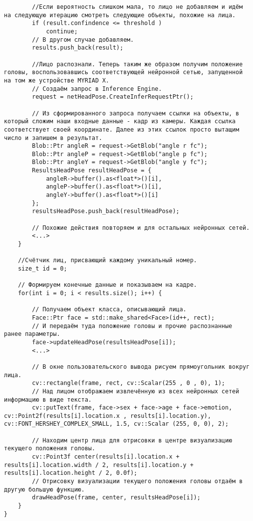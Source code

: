 \documentclass[12pt,a4paper]{scrartcl}
\begin{document}
\begin{verbatim}
		//Если вероятность слишком мала, то лицо не добавляем и идём на следующую итерацию смотреть следующие объекты, похожие на лица.
		if (result.confindence <= threshold ) 
			continue;
		// В другом случае добавляем.
		results.push_back(result);
		
		//Лицо распознали. Теперь таким же образом получим положение головы, воспользовавшись соответствующей нейронной сетью, запущенной на том же устройстве MYRIAD X.
		// Создаём запрос в Inference Engine.
		request = netHeadPose.CreateInferRequestPtr();
		
		// Из сформированного запроса получаем ссылки на объекты, в который сложим наши входные данные - кадр из камеры. Каждая ссылка соответствует своей координате. Далее из этих ссылок просто вытащим число и запишем в результат.
		Blob::Ptr angleR = request->GetBlob("angle r fc");
		Blob::Ptr angleP = request->GetBlob("angle p fc");
		Blob::Ptr angleY = request->GetBlob("angle y fc");
		ResultsHeadPose resultHeadPose = {
			angleR->buffer().as<float*>()[i],
			angleP->buffer().as<float*>()[i],
			angleY->buffer().as<float*>()[i]
		};
		resultsHeadPose.push_back(resultHeadPose);
		
		// Похожие действия повторяем и для остальных нейронных сетей.
		<...>
	}

	//Счётчик лиц, присвающий каждому уникальный номер.
	size_t id = 0;

	// Формируем конечные данные и показываем на кадре.
	for(int i = 0; i < results.size(); i++) {
	
		// Получаем объект класса, описывающий лица.
		Face::Ptr face = std::make_shared<Face>(id++, rect);
		// И передаём туда положение головы и прочие распознанные ранее параметры.
		face->updateHeadPose(resultsHeadPose[i]);
		<...>

		// В окне пользовательского вывода рисуем прямоугольник вокруг лица.
		cv::rectangle(frame, rect, cv::Scalar(255 , 0 , 0), 1);
		// Над лицом отображаем извлечённую из всех нейронных сетей информацию в виде текста.
		cv::putText(frame, face->sex + face->age + face->emotion, cv::Point2f(results[i].location.x , results[i].location.y), cv::FONT_HERSHEY_COMPLEX_SMALL, 1.5, cv::Scalar (255, 0, 0), 2);
		
		// Находим центр лица для отрисовки в центре визуализацию текущего положения головы.
		cv::Point3f center(results[i].location.x + results[i].location.width / 2, results[i].location.y + results[i].location.height / 2, 0.0f);
		// Отрисовку визуализации текущего положения головы отдаём в другую большую функцию.
		drawHeadPose(frame, center, resultsHeadPose[i]);
	}
}
			\end{verbatim}
			
\end{document}

